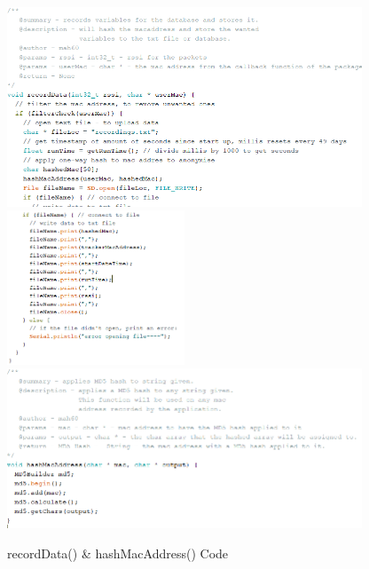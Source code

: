 \documentclass{report}
\begin{document}
\begin{figure}[h!]
    \centering
    \includegraphics[width=400]{recorddata_1.PNG} 
    \includegraphics[width=200]{recorddata_2.PNG}
    \includegraphics[width=400]{MD5_hash.PNG}
    \caption{recordData() & hashMacAddress() Code}
    \label{fig:recordData_MD5hash}
\end{figure} \\
\clearpage
\end{document}
